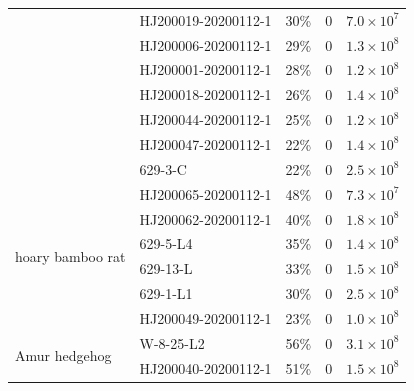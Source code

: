 \documentclass[9pt,twocolumn,twoside]{gsajnl_modified}
\begin{document}
\begin{table}
{\begin{tabular}{llrrr}
                 & HJ200019-20200112-1 &                                30\% &                        0 &                     $7.0 \times 10^7$ \\
                 & HJ200006-20200112-1 &                                29\% &                        0 &                   $1.3 \times 10^8$ \\
                 & HJ200001-20200112-1 &                                28\% &                        0 &                   $1.2 \times 10^8$ \\
                 & HJ200018-20200112-1 &                                26\% &                        0 &                   $1.4 \times 10^8$ \\
                 & HJ200044-20200112-1 &                                25\% &                        0 &                   $1.2 \times 10^8$ \\
                 & HJ200047-20200112-1 &                                22\% &                        0 &                   $1.4 \times 10^8$ \\
                 & 629-3-C &                                22\% &                        0 &                   $2.5 \times 10^8$ \\
\cline{1-5}
\multirow{6}{*}{hoary bamboo rat} & HJ200065-20200112-1 &                                48\% &                        0 &                   $7.3 \times 10^7$ \\
                 & HJ200062-20200112-1 &                                40\% &                        0 &                   $1.8 \times 10^8$ \\
                 & 629-5-L4 &                                35\% &                        0 &                   $1.4 \times 10^8$ \\
                 & 629-13-L &                                33\% &                        0 &                   $1.5 \times 10^8$ \\
                 & 629-1-L1 &                                30\% &                        0 &                   $2.5 \times 10^8$ \\
                 & HJ200049-20200112-1 &                                23\% &                        0 &                     $1.0 \times 10^8$ \\
\cline{1-5}
\multirow{6}{*}{Amur hedgehog} & W-8-25-L2 &                                56\% &                        0 &                   $3.1 \times 10^8$ \\
                 & HJ200040-20200112-1 &                                51\% &                        0 &                   $1.5 \times 10^8$ \\

\end{tabular}}
\end{table}
\end{document}
